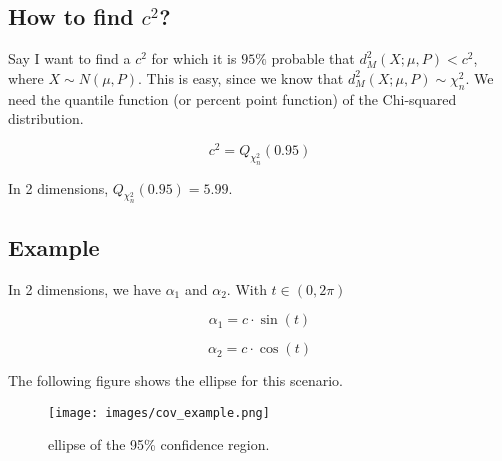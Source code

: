 \documentclass{article}
\begin{document}
\subsection{How to find $c^2$?}

Say I want to find a $c^2$ for which it is $95\%$ probable that $d_M^2(X; \mu, P) < c^2$, where $X \sim N(\mu, P)$. This is easy, since we know that $d_M^2(X; \mu, P) \sim \chi_n^2$. We need the quantile function (or percent point function) of the Chi-squared distribution.

\begin{equation}
    c^2 = Q_{\chi_n^2} (0.95)
\end{equation}

In 2 dimensions, $Q_{\chi_n^2} (0.95) = 5.99$.

\subsection{Example}

In 2 dimensions, we have $\alpha_1$ and $\alpha_2$. With $t \in (0, 2\pi)$

\begin{equation}
    \alpha_1 = c \cdot \sin(t)
\end{equation}

\begin{equation}
    \alpha_2 = c \cdot \cos(t)
\end{equation}

The following figure shows the ellipse for this scenario.

\begin{figure}[ht]
 \centering
  \texttt{[image: images/cov\_example.png]}
 \caption{ellipse of the 95\% confidence region.}
\end{figure}
\end{document}
